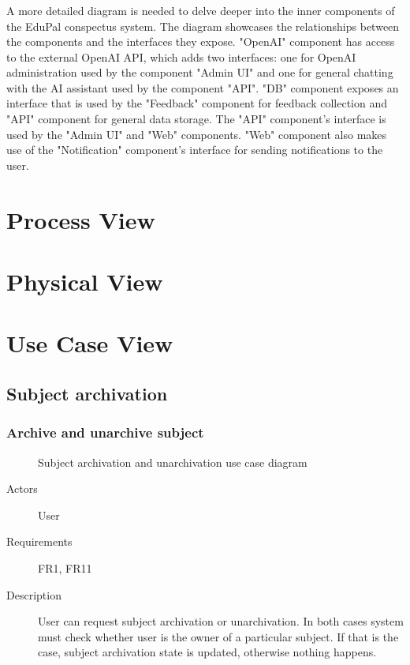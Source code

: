 \documentclass[
    english, %
]{VUMIFPSkursinis}
\begin{document}
\subsubsection*{} A more detailed diagram is needed to delve deeper into the inner components of the EduPal conspectus system. The diagram showcases the relationships between the components and the interfaces they expose. "OpenAI" component has access to the external OpenAI API, which adds two interfaces: one for OpenAI administration used by the component "Admin UI" and one for general chatting with the AI assistant used by the component "API". "DB" component exposes an interface that is used by the "Feedback" component for feedback collection and "API" component for general data storage. The "API" component's interface is used by the "Admin UI" and "Web" components. "Web" component also makes use of the "Notification" component's interface for sending notifications to the user.

\section{Process View}

\section{Physical View}

\section{Use Case View}

\subsection{Subject archivation}

\subsubsection{Archive and unarchive subject}

\begin{figure}[ht]
    \centering
    
    \label{archivation-use-case}
    \caption{Subject archivation and unarchivation use case diagram}
\end{figure}

\begin{description}
    \item[Actors] User
    \item[Requirements] FR1, FR11
    \item[Description] User can request subject archivation or unarchivation. In both cases system must check whether user is the owner of a particular subject. If that is the case, subject archivation state is updated, otherwise nothing happens.
\end{description}
\end{document}
